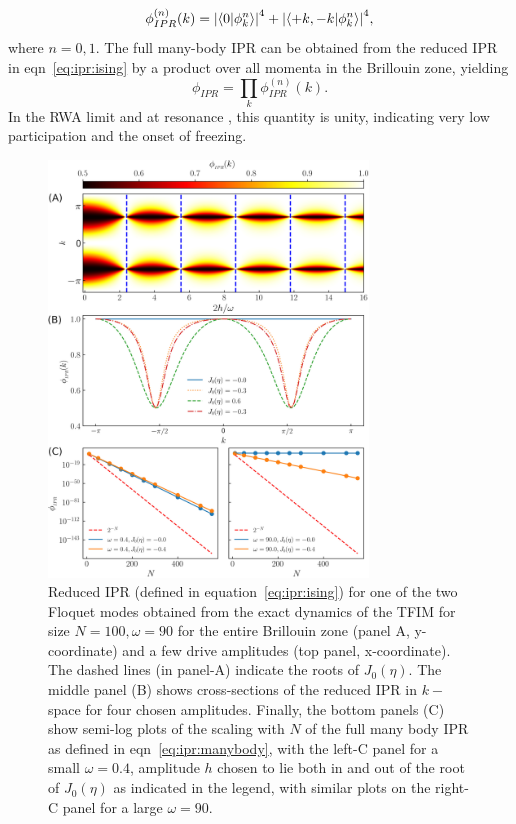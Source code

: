 \documentclass[%
reprint,
superscriptaddress,
amsmath,amssymb,
aps,
prb,
showkeys,
]{revtex4-2}
\begin{document}
	\begin{equation}
		\label{eq:ipr:ising}
		\phi^{(n)}_{IPR}(k) = \abs{\ip{0}{\phi^n_k}}^4 + \abs{\ip{ +k, -k }{\phi^n_k}}^4,
	\end{equation}
	where $n=0,1$. {The full many-body IPR can be obtained from the reduced IPR in eqn}~\ref{eq:ipr:ising} {by a product over all momenta in the Brillouin zone, yielding}
	\begin{equation}
		\label{eq:ipr:manybody}
		\phi_{IPR} = \prod_k \phi^{(n)}_{IPR}(k).
	\end{equation}
	In the RWA limit and at resonance , this quantity is unity, indicating very low participation and the onset of freezing.
	\begin{figure}[t!]
		\centering
		\includegraphics[width = 8.5cm]{ising_exact_ipr_3panel1.jpeg}
		\caption{Reduced IPR (defined in equation~\ref{eq:ipr:ising}) {for one of the two Floquet modes obtained from the exact dynamics of the TFIM for size} $N = 100, \omega=90$ {for the entire Brillouin zone (panel A, y-coordinate) and a few drive amplitudes (top panel, x-coordinate). The dashed lines (in panel-A) indicate the roots of} $J_0(\eta)${. The middle panel (B) shows cross-sections of the reduced IPR in} $k-$ {space for four chosen amplitudes. Finally, the bottom panels (C) show semi-log plots of the scaling with} $N$ {of the full many body IPR as defined in eqn}~\ref{eq:ipr:manybody}{, with the left-C panel for a small} $\omega=0.4$, amplitude $h$ {chosen to lie both in and out of the root of} $J_0(\eta)$ {as indicated in the legend, with similar plots on the right-C panel for a large} $\omega=90$. }
		\label{fig:ipr:tfim}
	\end{figure}
\end{document}
